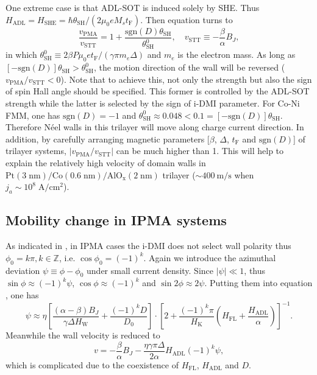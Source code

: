 \documentclass[12pt]{iopart}
\begin{document}
One extreme case is that ADL-SOT is induced solely by SHE.
Thus $H_{\mathrm{ADL}}=H_{\mathrm{SHE}}=\hbar\theta_{\mathrm{SH}}/(2\mu_{0}e M_s t_{\mathrm{F}})$.
Then equation  turns to
\begin{equation}\label{v_all3_PMA_small_ja_final}
\frac{v_{\mathrm{PMA}}}{v_{\mathrm{STT}}}=1+\frac{\mathrm{sgn}(D)\theta_{\mathrm{SH}}}{\theta_{\mathrm{SH}}^0}, \quad v_{\mathrm{STT}}\equiv -\frac{\beta}{\alpha} B_J,
\end{equation}
in which $\theta_{\mathrm{SH}}^0\equiv 2\beta P \mu_{0} e t_{\mathrm{F}}/(\gamma\pi m_e \Delta)$
and $m_e$ is the electron mass. 
As long as $[-\mathrm{sgn}(D)]\theta_{\mathrm{SH}}>\theta_{\mathrm{SH}}^0$, the motion direction
of the wall will be reversed ($v_{\mathrm{PMA}}/v_{\mathrm{STT}}<0$).
Note that to achieve this, not only the strength but also the sign of spin Hall angle should be specified.
This former is controlled by the ADL-SOT strength while the latter is selected by the sign of i-DMI parameter.
For Co-Ni FMM, one has $\mathrm{sgn}(D)=-1$ and $\theta_{\mathrm{SH}}^0\approx 0.048<0.1=[-\mathrm{sgn}(D)]\theta_{\mathrm{SH}}$. 
Therefore N\'{e}el walls in this trilayer will move along charge current direction.
In addition, by carefully arranging magnetic parameters [$\beta$, $\Delta$, $t_{\mathrm{F}}$ and $\mathrm{sgn}(D)$]
of trilayer systems, $|v_{\mathrm{PMA}}/v_{\mathrm{STT}}|$ can be much higher than 1.
This will help to explain the relatively high velocity of domain walls 
in $\mathrm{Pt(3\;nm)/Co(0.6\;nm)/AlO_x(2\;nm)}$ trilayer ($\sim 400\ \mathrm{m/s}$ when $j_a\sim 10^{8}\;\mathrm{A/cm^2}$)\cite{Miron_Nmat_2011}.


\subsection{Mobility change in IPMA systems}\label{MobilityChangeByADLSOT:IPMA}
As indicated in , in IPMA cases the i-DMI does not select wall polarity
thus $\phi_0=k\pi,k\in\mathbb{Z}$, i.e. $\cos\phi_0=(-1)^k$.
Again we introduce the azimuthal deviation $\psi\equiv \phi-\phi_0$ under small current density.
Since $|\psi|\ll 1$, thus $\sin\phi\approx (-1)^k\psi$, $\cos\phi\approx (-1)^k$ and $\sin 2\phi\approx 2\psi$.
Putting them into equation , one has
\begin{equation}\label{psi_solved_FL_and_ADL_SOTs}
\psi\approx \eta\left[\frac{(\alpha-\beta) B_J}{\gamma \Delta H_{\mathrm{W}}}+\frac{(-1)^k D}{D_0}\right]\cdot\left[2+\frac{(-1)^k \pi}{H_{\mathrm{K}}}\left(H_{\mathrm{FL}}+\frac{H_{\mathrm{ADL}}}{\alpha}\right)\right]^{-1}.
\end{equation}
Meanwhile the wall velocity is reduced to
\begin{equation}\label{v_all3_IPMA_small_ja}
v=-\frac{\beta}{\alpha}B_J-\frac{\eta\gamma\pi\Delta}{2\alpha}H_{\mathrm{ADL}}(-1)^k\psi,
\end{equation}
which is complicated due to the coexistence of $H_{\mathrm{FL}}$, $H_{\mathrm{ADL}}$ and $D$.
\end{document}

